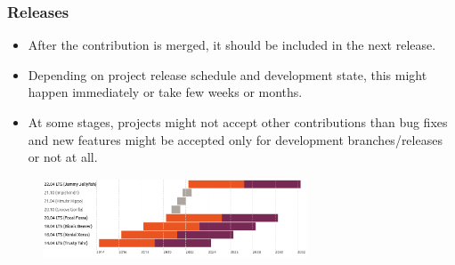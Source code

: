 \documentclass[aspectratio=169]{beamer}              %
\begin{document}
\begin{frame}
	\frametitle{Releases}
	
\begin{block}{}
		\begin{itemize}
			\item After the contribution is merged, it should be included in the next release.
			\item Depending on project release schedule and development state, this might happen immediately or take few weeks or months.
			\item At some stages, projects might not accept other contributions than bug fixes and new features might be accepted only for development branches/releases or not at all.
		\end{itemize}
\end{block}
\begin{figure}[ht!]
	\begin{center}
  	  \includegraphics[width=0.7\textwidth]{img/ubuntu-releases.png}
	\end{center}
\end{figure}

\end{frame}
\end{document}
